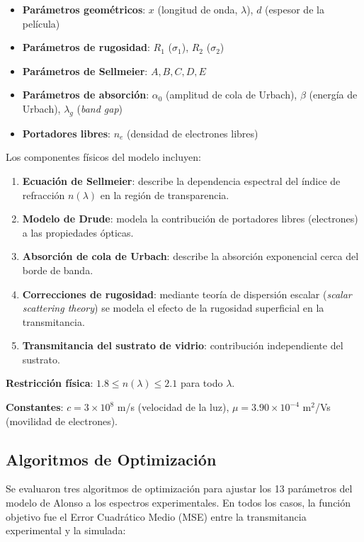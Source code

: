 \documentclass{article}
\begin{document}
\begin{itemize}
    \item \textbf{Par\'ametros geom\'etricos}: $x$ (longitud de onda, $\lambda$), $d$ (espesor de la pel\'icula)
    \item \textbf{Par\'ametros de rugosidad}: $R_1$ ($\sigma_1$), $R_2$ ($\sigma_2$)
    \item \textbf{Par\'ametros de Sellmeier}: $A, B, C, D, E$
    \item \textbf{Par\'ametros de absorci\'on}: $\alpha_0$ (amplitud de cola de Urbach), $\beta$ (energ\'ia de Urbach), $\lambda_g$ (\textit{band gap})
    \item \textbf{Portadores libres}: $n_e$ (densidad de electrones libres)
\end{itemize}

Los componentes f\'isicos del modelo incluyen:
\begin{enumerate}
    \item \textbf{Ecuaci\'on de Sellmeier}: describe la dependencia espectral del \'indice de refracci\'on $n(\lambda)$ en la regi\'on de transparencia.
    \item \textbf{Modelo de Drude}: modela la contribuci\'on de portadores libres (electrones) a las propiedades \'opticas.
    \item \textbf{Absorci\'on de cola de Urbach}: describe la absorci\'on exponencial cerca del borde de banda.
    \item \textbf{Correcciones de rugosidad}: mediante teor\'ia de dispersi\'on escalar (\textit{scalar scattering theory}) se modela el efecto de la rugosidad superficial en la transmitancia.
    \item \textbf{Transmitancia del sustrato de vidrio}: contribuci\'on independiente del sustrato.
\end{enumerate}

\textbf{Restricci\'on f\'isica}: $1.8 \leq n(\lambda) \leq 2.1$ para todo $\lambda$.

\textbf{Constantes}: $c = 3 \times 10^8$ m/s (velocidad de la luz), $\mu = 3.90 \times 10^{-4}$ m$^2$/Vs (movilidad de electrones).

\subsection{Algoritmos de Optimizaci\'on}

Se evaluaron tres algoritmos de optimizaci\'on para ajustar los 13 par\'ametros del modelo de Alonso a los espectros experimentales. En todos los casos, la funci\'on objetivo fue el Error Cuadr\'atico Medio (MSE) entre la transmitancia experimental y la simulada:
\end{document}
